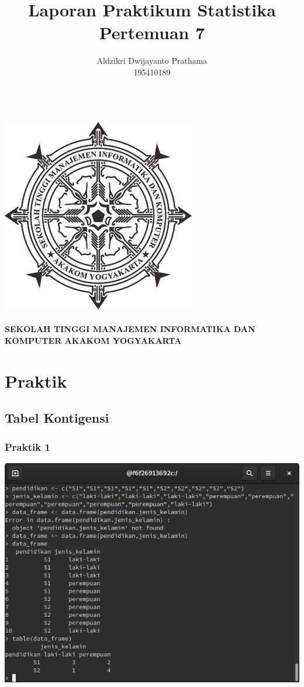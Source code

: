 \documentclass[a4paper,12pt]{article}
\begin{document}
\title{Laporan Praktikum Statistika Pertemuan 7}
\author{Aldzikri Dwijayanto Prathama 
	\\195410189}
\makeatletter
\begin{titlepage}
	\begin{center}
		{\huge \bfseries \@title }\\[14ex]
		\includegraphics[scale=.8]{logo}\\[4ex]
		{\large \@author}\\[20ex]
		{\large \bfseries {SEKOLAH TINGGI MANAJEMEN INFORMATIKA DAN KOMPUTER
				AKAKOM YOGYAKARTA}}
	\end{center}


\end{titlepage}
\makeatother
\newpage
\section{Praktik}
\subsection{Tabel Kontigensi}
\subsubsection{Praktik 1}
\includegraphics[width=\linewidth]{1}
\end{document}
